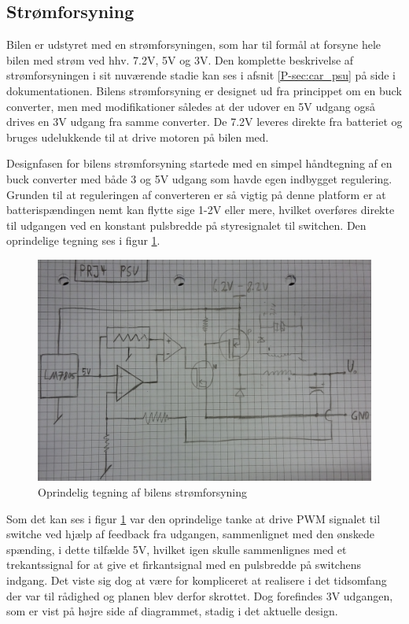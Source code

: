 \subsection{Strømforsyning}\label{sec:hwd_psu}

Bilen er udstyret med en strømforsyningen, som har til formål at forsyne hele bilen med strøm ved hhv. 7.2V, 5V og 3V. 
Den komplette beskrivelse af strømforsyningen i sit nuværende stadie kan ses i afsnit \ref{P-sec:car_psu}  på side \pageref{P-sec:car_psu} i dokumentationen.
Bilens strømforsyning er designet ud fra princippet om en buck converter\cite[s. 326] {lib:analogteknik}, men med modifikationer således at der udover en 5V udgang også drives en 3V udgang fra samme converter.
De 7.2V leveres direkte fra batteriet og bruges udelukkende til at drive motoren på bilen med.

Designfasen for bilens strømforsyning startede med en simpel håndtegning af en buck converter med både 3 og 5V udgang som havde egen indbygget regulering. 
Grunden til at reguleringen af converteren er så vigtig på denne platform er at batterispændingen nemt kan flytte sige 1-2V eller mere, hvilket overføres direkte til udgangen ved en konstant pulsbredde på styresignalet til switchen. Den oprindelige tegning ses i figur \ref{fig:bil_psu_sketch}.

\begin{figure}[h]
\centering
\includegraphics[width=\textwidth]{../fig/diagrammer/bil/psu_sketch}
\caption{Oprindelig tegning af bilens strømforsyning}
\label{fig:bil_psu_sketch}
\end{figure}

Som det kan ses i figur \ref{fig:bil_psu_sketch} var den oprindelige tanke at drive PWM signalet til switche ved hjælp af feedback fra udgangen, sammenlignet med den ønskede spænding, i dette tilfælde 5V, hvilket igen skulle sammenlignes med et trekantssignal for at give et firkantsignal med en pulsbredde på switchens indgang.
Det viste sig dog at være for kompliceret at realisere i det tidsomfang der var til rådighed og planen blev derfor skrottet.
Dog forefindes 3V udgangen, som er vist på højre side af diagrammet, stadig i det aktuelle design.

